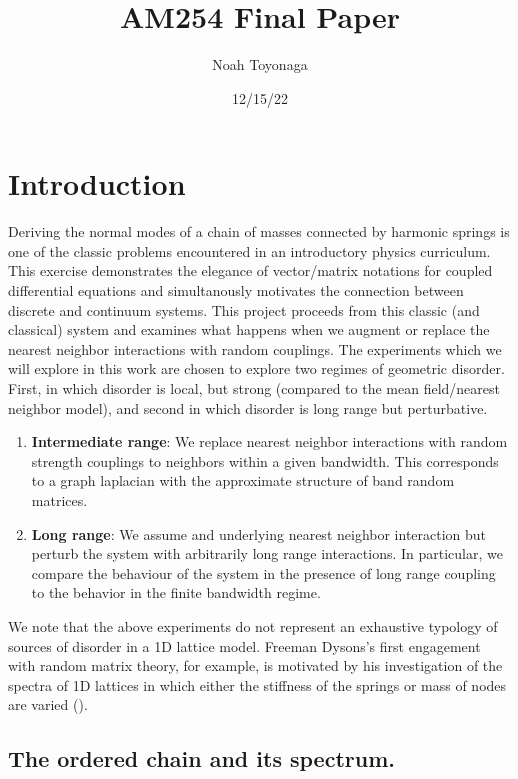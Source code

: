 \documentclass{article}
\title{AM254 Final Paper}
\author{Noah Toyonaga}
\date{12/15/22}
\begin{document}
\maketitle


\section{Introduction}
Deriving the normal modes of a chain of masses connected by harmonic springs is one of the 
classic problems encountered in an introductory physics curriculum.
This exercise demonstrates the elegance of 
vector/matrix notations for coupled differential equations 
and simultanously motivates the connection between discrete and continuum systems. 
This project proceeds from this classic (and classical) system
and examines what happens when we augment or replace the nearest neighbor interactions with random couplings. 
The experiments which we will explore in this work are chosen to explore two regimes of geometric disorder. 
First, in which disorder is local, but strong (compared to the mean field/nearest neighbor model), and second in which disorder is long range but perturbative. 

\begin{enumerate}
	\item \textbf{Intermediate range}: We replace nearest neighbor interactions with random strength couplings to
		neighbors within a given bandwidth. 
		This corresponds to a graph laplacian with the approximate structure of band random matrices. 
	\item \textbf{Long range}: We assume and underlying nearest neighbor interaction but perturb the system with arbitrarily long range interactions.
		In particular, we compare the behaviour of the system in the presence of long range coupling to the behavior in the finite bandwidth regime. 
\end{enumerate}

We note that the above experiments do not represent an exhaustive typology of sources of disorder in a 1D lattice model. 
Freeman Dysons's first engagement with random matrix theory, for example,
is motivated by his investigation of the spectra 
of 1D lattices in which either the stiffness of the springs or mass of nodes are varied (\cite{Dyson1953-oa,Forrester2021-xr}). 

\subsection{The ordered chain and its spectrum.}
\end{document}
